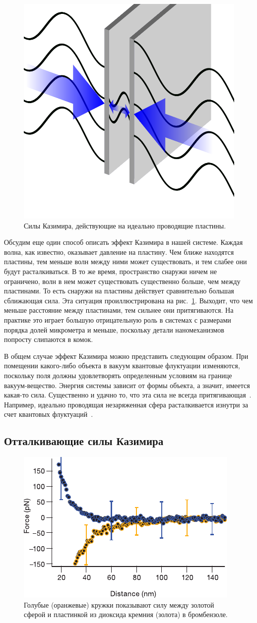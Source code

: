 \documentclass[a4paper, 12pt]{article}
\begin{document}
\begin{figure}[t!]
\includegraphics[width=.4\linewidth]{figs/Casimir-plates.pdf}
\caption{Силы Казимира, действующие на идеально проводящие пластины.}
\label{fig:plates}
\end{figure}

Обсудим еще один способ описать эффект Казимира в нашей системе. 
Каждая волна, как известно, оказывает давление на пластину. 
Чем ближе находятся пластины, тем меньше волн между ними может существовать, и тем слабее они будут расталкиваться. 
В то же время, пространство снаружи ничем не ограничено, волн в нем может существовать существенно больше, чем между пластинами. 
То есть снаружи на пластины действует сравнительно большая сближающая сила. 
Эта ситуация проиллюстрирована на рис.~\ref{fig:plates}. 
Выходит, что чем меньше расстояние между пластинами, тем сильнее они притягиваются. 
На практике это играет большую отрицательную роль в системах с размерами порядка долей микрометра и меньше, поскольку детали наномеханизмов попросту слипаются в комок. 

В общем случае эффект Казимира можно представить следующим образом. 
При помещении какого-либо объекта в вакуум квантовые флуктуации изменяются, поскольку поля должны удовлетворять определенным условиям на границе вакуум-вещество. 
Энергия системы зависит от формы объекта, а значит, имеется какая-то сила. 
Существенно и удачно то, что эта сила не всегда притягивающая~\cite{General.van-der-Waals}. 
Например, идеально проводящая незаряженная сфера расталкивается изнутри за счет квантовых флуктуаций~\cite{SphericalShell}. 

\subsection{Отталкивающие силы Казимира}

\begin{figure}
\includegraphics[width=.5\linewidth]{figs/Repulsive-graph}
\caption{Голубые (оранжевые) кружки показывают силу между золотой сферой и пластинкой из диоксида кремния (золота) в бромбензоле.}
\label{fig:rep.graph}
\end{figure}
\end{document}

